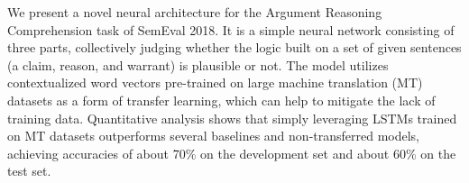 We present a novel neural architecture for the Argument Reasoning Comprehension task of SemEval 2018. It is a simple neural network consisting of three parts, collectively judging whether the logic built on a set of given sentences (a claim, reason, and warrant) is plausible or not. The model utilizes contextualized word vectors pre-trained on large machine translation (MT) datasets as a form of transfer learning, which can help to mitigate the lack of training data. Quantitative analysis shows that simply leveraging LSTMs trained on MT datasets outperforms several baselines and non-transferred models, achieving accuracies of about 70\% on the development set and about 60\% on the test set.
